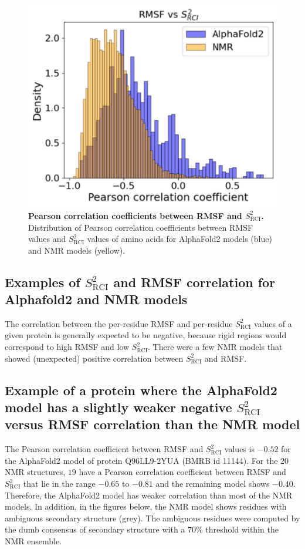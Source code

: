 \begin{figure}[H]
    \centering
    \includegraphics[width=0.75\linewidth]{pLDDT//plddt_figures//supplementary_bhawna/supfig18.pdf}
    \caption{\textbf{Pearson correlation coefficients between RMSF and $S_{\text{RCI}}^{2}$.} Distribution of Pearson correlation coefficients between RMSF values and $S_{\text{RCI}}^{2}$ values of amino acids for AlphaFold2 models (blue) and NMR models (yellow).}
    \label{fig:plddt_sup:sup18}
\end{figure}

\subsection*{Examples of $S_{\text{RCI}}^{2}$ and RMSF correlation for Alphafold2 and NMR models}

The correlation between the per-residue RMSF and per-residue $S_{\text{RCI}}^{2}$ values of a given protein is generally expected to be negative, because rigid regions would correspond to high RMSF and low $S_{\text{RCI}}^{2}$. There were a few NMR models that showed (unexpected) positive correlation between $S_{\text{RCI}}^{2}$ and RMSF.

\subsection*{Example of a protein where the AlphaFold2 model has a slightly weaker negative $S_{\text{RCI}}^{2}$ versus RMSF correlation than the NMR model}

The Pearson correlation coefficient between RMSF and $S_{\text{RCI}}^{2}$ values is $-0.52$ for the AlphaFold2 model of protein Q96LL9-2YUA (BMRB id 11144). For the $20$ NMR structures, $19$ have a Pearson correlation coefficient between RMSF and $S_{\text{RCI}}^{2}$ that lie in the range $-0.65$ to $-0.81$ and the remaining model shows $-0.40$. Therefore, the AlphaFold2 model has weaker correlation than most of the NMR models. In addition, in the figures below, the NMR model shows residues with ambiguous secondary structure (grey). The ambiguous residues were computed by the dumb consensus of secondary structure with a $70\%$ threshold within the NMR ensemble.

